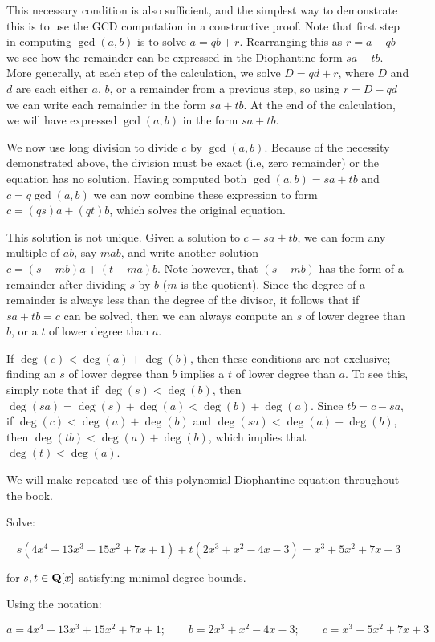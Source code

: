 This necessary condition is also sufficient, and the simplest way to
demonstrate this is to use the GCD computation in a constructive
proof.  Note that first step in computing $\gcd(a,b)$ is to solve
$a=qb+r$.  Rearranging this as $r=a-qb$ we see how the remainder can
be expressed in the Diophantine form $sa+tb$.  More generally, at each
step of the calculation, we solve $D=qd+r$, where $D$ and $d$ are each
either $a$, $b$, or a remainder from a previous step, so using
$r=D-qd$ we can write each remainder in the form $sa+tb$.  At the end
of the calculation, we will have expressed $\gcd(a,b)$ in the form
$sa+tb$.

We now use long division to divide $c$ by $\gcd(a,b)$.  Because of the
necessity demonstrated above, the division must be exact (i.e, zero
remainder) or the equation has no solution.  Having computed both
$\gcd(a,b)=sa+tb$ and $c=q\gcd(a,b)$ we can now combine these
expression to form $c=(qs)a+(qt)b$, which solves the original
equation.

This solution is not unique.  Given a solution to $c=sa+tb$, we can
form any multiple of $ab$, say $mab$, and write another solution
$c=(s-mb)a+(t+ma)b$.  Note however, that $(s-mb)$ has the form of a
remainder after dividing $s$ by $b$ ($m$ is the quotient).  Since the
degree of a remainder is always less than the degree of the divisor,
it follows that if $sa+tb=c$ can be solved, then we can always compute
an $s$ of lower degree than $b$, or a $t$ of lower degree than $a$.

If $\deg(c)<\deg(a)+\deg(b)$, then these conditions are not exclusive;
finding an $s$ of lower degree than $b$ implies a $t$ of lower degree
than $a$.  To see this, simply note that if $\deg(s)<\deg(b)$, then
$\deg(sa)=\deg(s)+\deg(a)<\deg(b)+\deg(a)$.  Since $tb=c-sa$, if
$\deg(c)<\deg(a)+\deg(b)$ and $\deg(sa)<\deg(a)+\deg(b)$, then
$\deg(tb)<\deg(a)+\deg(b)$, which implies that $\deg(t)<\deg(a)$.

We will make repeated use of this polynomial Diophantine equation
throughout the book.

\vfill\eject

\example

Solve:

$$s(4x^4+13x^3+15x^2+7x+1) + t(2x^3+x^2-4x-3) = x^3 + 5x^2 + 7x +3$$

\quad for $s,t \in {\bf Q}[x]$ satisfying minimal degree bounds.

Using the notation:

$$a = 4x^4+13x^3+15x^2+7x+1; \qquad
b = 2x^3+x^2-4x-3; \qquad
c = x^3 + 5x^2 + 7x +3$$

